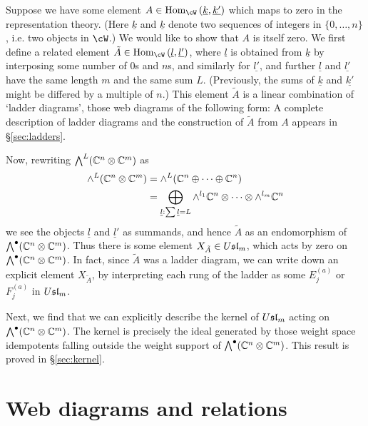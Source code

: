 \documentclass[11pt,leqno]{article}
\begin{document}
Suppose we have some element $A \in \Hom{\cW}{\underline{k}}{\underline{k'}}$ which maps to zero in the representation theory. (Here $\underline{k}$ and $\underline{k}$ denote two sequences of integers in $\{0,\ldots,n\}$, i.e. two objects in $\cW$.) We would like to show that $A$ is itself zero. We first define a related element $\tilde{A} \in \Hom{\cW}{\underline{l}}{\underline{l'}}$, where $\underline{l}$ is obtained from $\underline{k}$ by interposing some number of $0$s and $n$s, and similarly for $\underline{l'}$, and further $\underline{l}$ and $\underline{l'}$ have the same length $m$ and the same sum $L$. (Previously, the sums of $\underline{k}$ and $\underline{k'}$ might be differed by a multiple of $n$.) This element $\tilde{A}$ is a linear combination of `ladder diagrams', those web diagrams of the following form:
A complete description of ladder diagrams and the construction of $\tilde{A}$ from $A$ appears in \S \ref{sec:ladders}.

Now, rewriting $\bigwedge^L(\mathbb C^n \otimes \mathbb C^m)$ as
\begin{align*}
\wedge^L(\mathbb C^n \otimes \mathbb C^m) & = \wedge^L(\mathbb C^n \oplus \cdots \oplus \mathbb C^n) \\
        & = \bigoplus_{\underline{l}: \sum \underline{l} = L} \wedge^{l_1} \mathbb C^n \otimes \cdots \otimes \wedge^{l_m} \mathbb C^n
\end{align*}
we see the objects $\underline{l}$ and $\underline{l}'$ as summands, and hence $\tilde{A}$ as an endomorphism of $\bigwedge^\bullet(\mathbb C^n \otimes \mathbb C^m)$. Thus there is some element $X_{\tilde{A}} \in U\mathfrak{sl}_{m}$, which acts by zero on $\bigwedge^\bullet(\mathbb C^n \otimes \mathbb C^m)$. In fact, since $\tilde{A}$ was a ladder diagram, we can write down an explicit element $X_{\tilde{A}}$, by interpreting each rung of the ladder as some $E^{(a)}_j$ or $F^{(a)}_j$ in $U\mathfrak{sl}_{m}$. 

Next, we find that we can explicitly describe the kernel of $U\mathfrak{sl}_{m}$ acting on $\bigwedge^\bullet(\mathbb C^n \otimes \mathbb C^m)$. The kernel is precisely the ideal generated by those weight space idempotents falling outside the weight support of $\bigwedge^\bullet(\mathbb C^n \otimes \mathbb C^m)$.  This result is proved in \S \ref{sec:kernel}.


\section{Web diagrams and relations}
\label{sec:diagrams}
\end{document}
